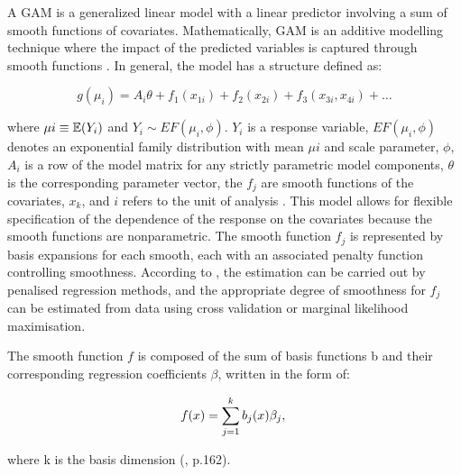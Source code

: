 A GAM is a generalized linear model with a linear predictor involving a sum of smooth functions of covariates. Mathematically, GAM is an additive modelling technique where the impact of the predicted variables is captured through smooth functions \citep{larsen_2015}. In general, the model has a structure defined as: 

\begin{equation}  \label{eq:3} 
g(\mu_{i}) = A_{i} \theta + f_{1}(x_{1i}) + f_{2}(x_{2i}) + f_{3}(x_{3i},x_{4i}) + \dots
\end{equation}

where $\mu{i} \equiv \displaystyle \operatorname{\mathbb{E}}(Y_{i})$ and $Y_{i} \sim EF(\mu_{i},\phi)$. $Y_{i}$ is a response variable, $EF(\mu_{i},\phi)$ denotes an exponential family distribution with mean $\mu{i}$ and scale parameter, $\phi$, $ A_{i}$ is a row of the model matrix for any strictly parametric model components, $\theta$ is the corresponding parameter vector, the $f_{j}$ are smooth functions of the covariates, $x_{k}$, and ${i}$ refers to the unit of analysis \citep{Wood_2017}. This model allows for flexible specification of the dependence of the response on the covariates because the smooth functions are nonparametric. The smooth function $f_{j}$ is represented by basis expansions for each smooth, each with an associated penalty function controlling  smoothness. According to \citet{Wood_2004, Wood_2017}, the estimation can be carried out by penalised regression methods, and the appropriate degree of smoothness for $f_{j}$ can be estimated from data using cross validation or marginal likelihood maximisation.

The smooth function $f$ is composed of the sum of basis functions b and their corresponding regression coefficients $\beta$, written in the form of:

\begin{equation}  \label{eq:4} 
f(x) = \sum\limits_{j=1}^k b_{j}(x) \beta_{j}, \\
\end{equation}

where k is the basis dimension (\citet{Wood_2017}, p.162). 



